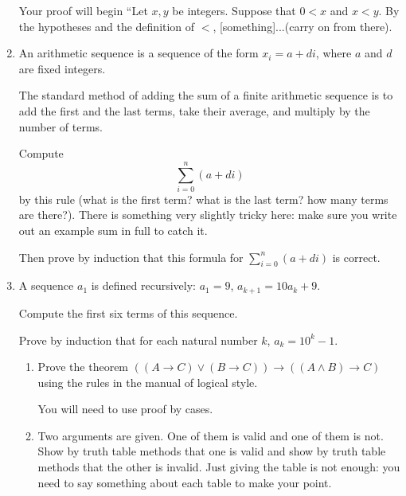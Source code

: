 \documentclass[12pt]{article}
\begin{document}
\begin{enumerate}
Your proof will begin ``Let $x,y$ be integers.  Suppose that $0<x$ and $x<y$.  By the hypotheses and the definition of $<$, [something]...(carry on from there).

\newpage

\item

An arithmetic sequence is a sequence of the form $x_i = a+di$, where $a$ and $d$ are fixed integers.

The standard method of adding the sum of a finite arithmetic sequence is to add the first and the last terms, take their average, and multiply by the number
of terms.

Compute $$\sum_{i=0}^n (a+di)$$ by this rule (what is the first term?  what is the last term?  how many terms are there?).  There is something very slightly tricky here:  make sure you write out an example sum in full to catch it.

Then prove by induction that this formula for $\sum_{i=0}^n (a+di)$ is correct.

\newpage

\item 

A sequence $a_1$ is defined recursively:  $a_1=9$, $a_{k+1} = 10a_k+9$.  

Compute the first six terms of this sequence.

Prove by induction that for each natural number $k$, $a_k = 10^k-1$.

\newpage
\begin{enumerate}
\item Prove the theorem $((A \rightarrow C) \vee (B \rightarrow C)) \rightarrow ((A \wedge B) \rightarrow C)$ using the rules in the manual of logical style.

You will need to use proof by cases.

\newpage

\item  Two arguments are given.  One of them is valid and one of them is not.  Show by truth table methods that one is valid and show by truth table methods
that the other is invalid.  Just giving the table is not enough:  you need to say something about each table to make your point.
\end{enumerate}
\end{enumerate}
\end{document}
